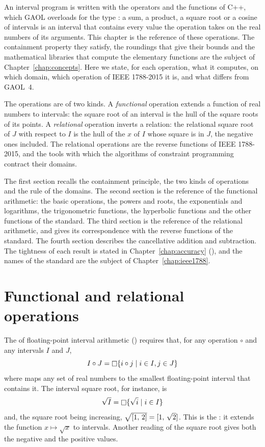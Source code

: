 \documentclass[12pt,a4paper,twoside,openright]{book}
\begin{document}
An interval program is written with the operators and the functions of C++,
which GAOL overloads for the type : a sum, a product, a square
root or a cosine of intervals is an interval that contains every value the
operation takes on the real numbers of its arguments. This chapter is the
reference of these operations. The containment property they satisfy, the
roundings that give their bounds and the mathematical libraries that compute
the elementary functions are the subject of Chapter~\ref{chap:concepts}. Here
we state, for each operation, what it computes, on which domain, which
operation of IEEE 1788-2015 \cite{IEEE1788:2015} it is, and what differs from
GAOL~4.

\medskip
The operations are of two kinds. A \emph{functional} operation extends a
function of real numbers to intervals: the square root of an interval is the
hull of the square roots of its points. A \emph{relational} operation inverts
a relation: the relational square root of $J$ with respect to $I$ is the hull
of the $x$ of $I$ whose square is in $J$, the negative ones included. The
relational operations are the reverse functions of IEEE 1788-2015, and the
tools with which the algorithms of constraint programming contract their
domains.

\medskip
The first section recalls the containment principle, the two kinds of
operations and the rule of the domains. The second section is the reference
of the functional arithmetic: the basic operations, the powers and roots, the
exponentials and logarithms, the trigonometric functions, the hyperbolic
functions and the other functions of the standard. The third section is the
reference of the relational arithmetic, and gives its correspondence with the
reverse functions of the standard. The fourth section describes the
cancellative addition and subtraction. The tightness of each result is
stated in Chapter~\ref{chap:accuracy} (), and the
names of the standard are the subject of Chapter~\ref{chap:ieee1788}.

\section{Functional and relational operations}\label{sec:arithmetic-kinds}
%

The  of floating-point interval arithmetic
() requires that, for any operation $\circ$ and any
intervals $I$ and $J$,
\begin{equation*}
I\circ J=\mathop{\Box} \{i\circ j\mid i\in I, j\in J\}
\end{equation*}
where \hull{} maps any set of real numbers to the smallest floating-point
interval that contains it. The interval square root, for instance, is
\begin{equation*}
\sqrt{I}=\mathop{\Box} \{\sqrt{i}\mid i\in I\}
\end{equation*}
and, the square root being increasing, $\sqrt{[1,\,2]}=[1,\,\sqrt{2}]$.
This is the : it extends the function
$x\mapsto\sqrt{x}$ to intervals. Another reading of the square root gives
both the negative and the positive values.
\end{document}
